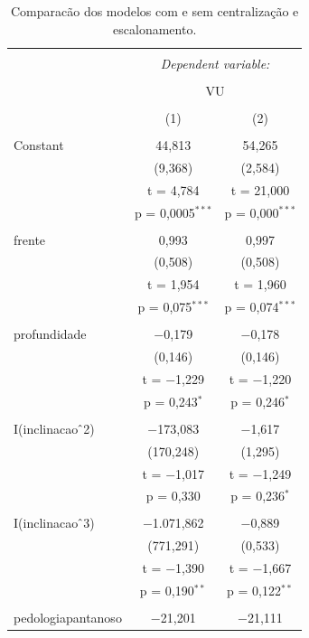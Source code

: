 \documentclass[a4paper, 12pt]{article}
\begin{document}
\begin{table}[!htbp] \centering 
  \caption{Comparacão dos modelos com e sem centralização e escalonamento.} 
  \label{tab:fits} 
\begin{tabular}{@{\extracolsep{5pt}}lcc} 
\\[-1.8ex]\hline 
\hline \\[-1.8ex] 
 & \multicolumn{2}{c}{\textit{Dependent variable:}} \\ 
\cline{2-3} 
\\[-1.8ex] & \multicolumn{2}{c}{VU} \\ 
\\[-1.8ex] & (1) & (2)\\ 
\hline \\[-1.8ex] 
 Constant & 44,813 & 54,265 \\ 
  & (9,368) & (2,584) \\ 
  & t = 4,784 & t = 21,000 \\ 
  & p = 0,0005$^{***}$ & p = 0,000$^{***}$ \\ 
  & & \\ 
 frente & 0,993 & 0,997 \\ 
  & (0,508) & (0,508) \\ 
  & t = 1,954 & t = 1,960 \\ 
  & p = 0,075$^{***}$ & p = 0,074$^{***}$ \\ 
  & & \\ 
 profundidade & $-$0,179 & $-$0,178 \\ 
  & (0,146) & (0,146) \\ 
  & t = $-$1,229 & t = $-$1,220 \\ 
  & p = 0,243$^{*}$ & p = 0,246$^{*}$ \\ 
  & & \\ 
 I(inclinacao$\hat{\mkern6mu}$2) & $-$173,083 & $-$1,617 \\ 
  & (170,248) & (1,295) \\ 
  & t = $-$1,017 & t = $-$1,249 \\ 
  & p = 0,330 & p = 0,236$^{*}$ \\ 
  & & \\ 
 I(inclinacao$\hat{\mkern6mu}$3) & $-$1.071,862 & $-$0,889 \\ 
  & (771,291) & (0,533) \\ 
  & t = $-$1,390 & t = $-$1,667 \\ 
  & p = 0,190$^{**}$ & p = 0,122$^{**}$ \\ 
  & & \\ 
 pedologiapantanoso & $-$21,201 & $-$21,111 \\ 

\end{tabular}
\end{table}
\end{document}
